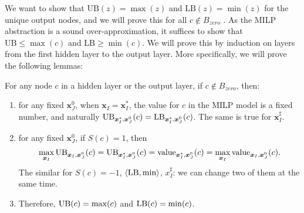 				
				We want to show that $\mathrm{UB}(z) = \max (z)$ and $\mathrm{LB}(z) = \min (z)$ for the unique output nodes, and we will prove this for all $c\notin B_{zero}$ . As the MILP abstraction is a sound over-approximation, 
				it suffices to show that $\mathrm{UB}\leq \max (c)$ and $\mathrm{LB} \geq \min (c)$. We will prove this by induction on layers from the first hidden layer to the output layer. More specifically, we will prove the following lemmas:
				
				
				\begin{lemma} \label{lem:main}
					For any node $c$ in a hidden layer or the output layer, if $c\notin B_{zero}$, then:		\begin{enumerate}
						\item for any fixed $\boldsymbol{x}^0_J$, when  $\boldsymbol{x}_I=\boldsymbol{x}^*_I$, the value for $c$ in the MILP model is a fixed number, and naturally $\mathrm{UB}_{\boldsymbol{x}^*_I,\boldsymbol{x}^0_J}(c)=\mathrm{LB}_{\boldsymbol{x}^*_I,\boldsymbol{x}^0_J}(c)$. The same is true for $\boldsymbol{x}^\sharp_I$.
						
						\item for any fixed $\boldsymbol{x}^0_J$, if $S(c)=1$, then $$\max_{\boldsymbol{x}_I} \mathrm{UB}_{\boldsymbol{x}_I,\boldsymbol{x}^0_J}(c)=\mathrm{UB}_{\boldsymbol{x}^*_I,\boldsymbol{x}^0_J}(c)= {\textrm{value}}_{\boldsymbol{x}^*_I,\boldsymbol{x}^0_J}(c) = \max_{\boldsymbol{x}_I} {\textrm{value}}_{\boldsymbol{x}_I,\boldsymbol{x}^0_J}(c).$$ The similar for $S(c)=-1$, $\langle \mathrm{LB},\min\rangle$, $x^\sharp_I$: we can change two of them at the same time.
						
						\item Therefore, $\mathrm{UB}(c)=\max(c)$ and $\mathrm{LB}(c)=\min(c)$.
					\end{enumerate}
	
					
					
				\end{lemma}
				
